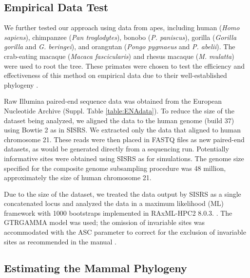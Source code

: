 \documentclass[11pt, oneside]{article}   	%
\begin{document}
\subsection{Empirical Data Test}

We further tested our approach using data from apes, including human (\textit{Homo sapiens}), chimpanzee (\textit{Pan troglodytes}), bonobo (\textit{P. paniscus}), gorilla (\textit{Gorilla gorilla} and \textit{G. beringei}), and orangutan (\textit{Pongo pygmaeus} and \textit{P. abelii}). 
The crab-eating macaque (\textit{Macaca fascicularis}) and rhesus macaque (\textit{M. mulatta}) were used to root the tree. 
These primates were chosen to test the efficiency and effectiveness of this method on empirical data due to their well-established phylogeny \citep{Perelman2011}. 

Raw Illumina paired-end sequence data was obtained from the European Nucleotide Archive (Suppl. Table \ref{table:ENAdata}). 
To reduce the size of the dataset being analyzed, we aligned the data to the human genome (build 37) using Bowtie 2 as in SISRS. 
We extracted only the data that aligned to human chromosome 21. 
These reads were then placed in FASTQ files as new paired-end datasets, as would be generated directly from a sequencing run. 
Potentially informative sites were obtained using SISRS as for simulations. 
The genome size specified for the composite genome subsampling procedure was 48 million, approximately the size of human chromosome 21.

Due to the size of the dataset, we treated the data output by SISRS as a single concatenated locus \citep{Yoder2013} and 
analyzed the data in a maximum likelihood (ML) framework with 1000 bootstraps implemented in RAxML-HPC2 8.0.3. \citep{Stamatakis2006}. 
The GTRGAMMA model was used; the omission of invariable sites was accommodated with the ASC parameter to correct for the exclusion of invariable sites as recommended in the manual \citep{Lewis2001}.

\subsection{Estimating the Mammal Phylogeny}
\end{document}
